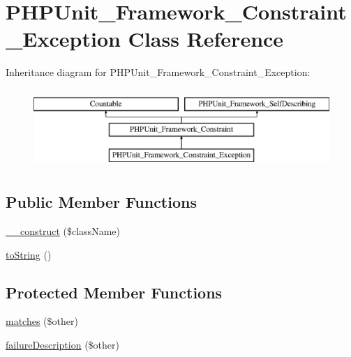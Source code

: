 \hypertarget{class_p_h_p_unit___framework___constraint___exception}{}\section{P\+H\+P\+Unit\+\_\+\+Framework\+\_\+\+Constraint\+\_\+\+Exception Class Reference}
\label{class_p_h_p_unit___framework___constraint___exception}
Inheritance diagram for P\+H\+P\+Unit\+\_\+\+Framework\+\_\+\+Constraint\+\_\+\+Exception\+:\begin{figure}[H]
\begin{center}
\leavevmode
\includegraphics[height=3.000000cm]{class_p_h_p_unit___framework___constraint___exception}
\end{center}
\end{figure}
\subsection*{Public Member Functions}
\begin{DoxyCompactItemize}
\item 
\mbox{\hyperlink{class_p_h_p_unit___framework___constraint___exception_a9b3aa4f43875a1fc02f564f4a077b33a}{\+\_\+\+\_\+construct}} (\$class\+Name)
\item 
\mbox{\hyperlink{class_p_h_p_unit___framework___constraint___exception_a5558c5d549f41597377fa1ea8a1cefa3}{to\+String}} ()
\end{DoxyCompactItemize}
\subsection*{Protected Member Functions}
\begin{DoxyCompactItemize}
\item 
\mbox{\hyperlink{class_p_h_p_unit___framework___constraint___exception_a9c9c337de483bbdbb9fa249a6c7c9cc5}{matches}} (\$other)
\item 
\mbox{\hyperlink{class_p_h_p_unit___framework___constraint___exception_aaabb679273bfb812df4d81c283754a59}{failure\+Description}} (\$other)
\end{DoxyCompactItemize}
